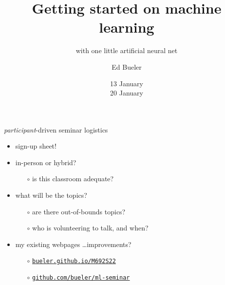 \documentclass[xcolor={svgnames},
               hyperref={colorlinks,citecolor=DeepPink4,linkcolor=FireBrick,urlcolor=Maroon}]
               {beamer}
\title{Getting started on machine learning}
\subtitle{{with one little artificial neural net}}
\author{Ed Bueler}
\institute[UAF]{MATH 692 Mathematics for Machine Learning \\ UAF}
\date[Spring 2022]{13 January \\ 20 January}
\begin{document}
\beamertemplatenavigationsymbolsempty

\begin{frame}
  \maketitle
\end{frame}


\begin{frame}{\emph{participant}-driven seminar logistics}

\begin{itemize}
\item sign-up sheet!
\item in-person or hybrid?
    \begin{itemize}
    \item[$\circ$] is this classroom adequate?
    \end{itemize}
\item what will be the topics?
    \begin{itemize}
    \item[$\circ$] are there out-of-bounds topics?
    \item[$\circ$] who is volunteering to talk, and when?
    \end{itemize}
\item my existing webpages \dots improvements?
    \begin{itemize}
    \item[$\circ$] \href{http://bueler.github.io/M692S22/index.html}{\texttt{bueler.github.io/M692S22}}
    \item[$\circ$] \href{https://github.com/bueler/ml-seminar}{\texttt{github.com/bueler/ml-seminar}}
    \end{itemize}
\end{itemize}
\end{frame}
\end{document}
